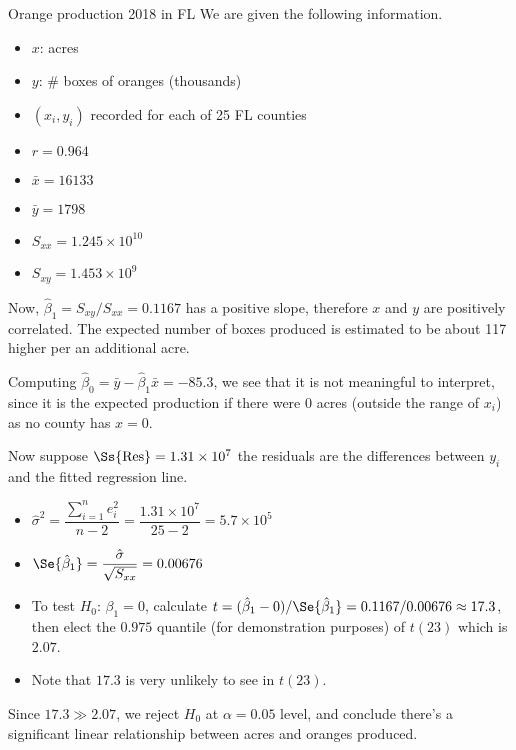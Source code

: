 \begin{Example}{Orange production 2018 in FL}{}
    We are given the following information.
    \begin{itemize}
        \item $ x $: acres
        \item $ y $: \# boxes of oranges (thousands)
        \item $ (x_i,y_i) $ recorded for each of 25 FL counties
        \item $ r=0.964 $
        \item $ \bar{x}=16133 $
        \item $ \bar{y}=1798 $
        \item $ S_{xx}=1.245\times 10^{10} $
        \item $ S_{xy}=1.453\times 10^9 $
    \end{itemize}
    Now,
    $ \hat{\beta}_1=S_{xy}/S_{xx}=0.1167 $
    has a positive slope, therefore $ x $ and $ y $ are
    positively correlated.
    The expected number of boxes produced is estimated to be about 117
    higher per an additional acre.

    Computing
    $ \hat{\beta}_0=\bar{y}-\hat{\beta}_1\bar{x}=-85.3 $,
    we see that it is
    not meaningful to interpret, since it
    is the expected production if there were 0 acres
    (outside the range of $ x_i $) as no county has $ x=0 $.

    Now suppose $ \Ss{\text{Res}}=1.31\times 10^7 $
    the residuals are the differences between $ y_i $ and the fitted regression
    line.
    \begin{itemize}
        \item $ \hat{\sigma}^2=\dfrac{\sum_{i=1}^{n} e_i^2}{n-2}=
                  \dfrac{1.31\times 10^7}{25-2}=5.7\times 10^5 $
        \item $ \Se{\hat{\beta}_1}=\dfrac{\hat{\sigma}}{\sqrt{S_{xx}}}=0.00676 $
        \item To test $ H_0 $: $ \beta_1 =0 $,
              calculate
              $ t=(\hat{\beta}_1-0)/\Se{\hat{\beta}_1}=0.1167/0.00676
                  \approx 17.3 $,
              then elect the $ 0.975 $ quantile (for demonstration purposes) of $ t(23) $
              which is $ 2.07 $.
        \item Note that $ 17.3 $ is very unlikely to see in $ t(23) $.
    \end{itemize}
    Since $ 17.3\gg2.07 $, we reject $ H_0 $ at $ \alpha=0.05 $
    level, and conclude there's a significant linear relationship between
    acres and oranges produced.


\end{Example}
